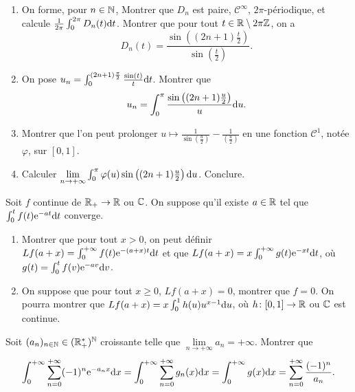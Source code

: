 \begin{exercise}
    \phantom{}
    \begin{enumerate}
        \item On forme, pour $n\in\mathbb{N}$, 
        Montrer que $D_n$ est paire, $\mathcal{C}^{\infty}$, $2\pi$-périodique, et calcule $\frac{1}{2\pi}\int_{0}^{2\pi}D_n(t)\mathrm{d} t$. Montrer que pour tout $t\in\mathbb{R}\setminus2\pi\mathbb{Z}$, on a 
        \begin{equation}
            D_n(t)=\frac{\sin\left((2n+1)\frac{t}{2}\right)}{\sin\left(\frac{t}{2}\right)}.
        \end{equation}

        \item On pose $u_n=\int_{0}^{(2n+1)\frac{\pi}{2}}\frac{\sin(t)}{t}\mathrm{d} t$. Montrer que 
        \begin{equation}
            u_n=\int_{0}^{\pi}\frac{\sin\left((2n+1)\frac{u}{2}\right)}{u}\mathrm{d} u.
        \end{equation}

        \item Montrer que l'on peut prolonger $u\mapsto \frac{1}{\sin\left(\frac{u}{2}\right)}-\frac{1}{\left(\frac{u}{2}\right)}$ en une fonction $\mathcal{C}^{1}$, notée $\varphi$, sur $[0,1]$.
        \item Calculer $\lim\limits_{n\to+\infty}\int_{0}^{\pi}\varphi(u)\sin\left((2n+1)\frac{u}{2}\right)\mathrm{d} u$. Conclure.
    \end{enumerate}
\end{exercise}

\begin{exercise}
    Soit $f$ continue de $\mathbb{R}_{+}\to\mathbb{R}$ ou $\mathbb{C}$. On suppose qu'il existe $a\in\mathbb{R}$ tel que $\int_{0}^{t}f(t)\mathrm{e}^{-a t}\mathrm{d} t$ converge.
    \begin{enumerate}
        \item Montrer que pour tout $x>0$, on peut définir $Lf(a+x)=\int_{0}^{+\infty}f(t)\mathrm{e}^{-(a+x)t}\mathrm{d} t$ et que $Lf(a+x)=x\int_{0}^{+\infty}g(t)\mathrm{e}^{-xt}\mathrm{d} t$, où $g(t)=\int_{0}^{t}f(v)\mathrm{e}^{-av}\mathrm{d} v$.
        \item On suppose que pour tout $x\geqslant 0$, $Lf(a+x)=0$, montrer que $f=0$. On pourra montrer que $Lf(a+x)=x\int_{0}^{1}h(u)u^{x-1}\mathrm{d} u$, où $h\colon[0,1]\to\mathbb{R}$ ou $\mathbb{C}$ est continue.
    \end{enumerate}
\end{exercise}

\begin{exercise}
    Soit $(a_n)_{n\in\mathbb{N}}\in(\mathbb{R}_{+}^{*})^{\mathbb{N}}$ croissante telle que $\lim\limits_{n\to+\infty}a_n=+\infty$. Montrer que 
    \begin{equation}
        \int_{0}^{+\infty}\sum_{n=0}^{+\infty}(-1)^{n}\mathrm{e}^{-a_n x}\mathrm{d} x=\int_{0}^{+\infty}\sum_{n=0}^{+\infty}g_n(x)\mathrm{d} x=\int_{0}^{+\infty}g(x)\mathrm{d} x=\sum_{n=0}^{+\infty}\frac{(-1)^{n}}{a_n}.
    \end{equation}
\end{exercise}